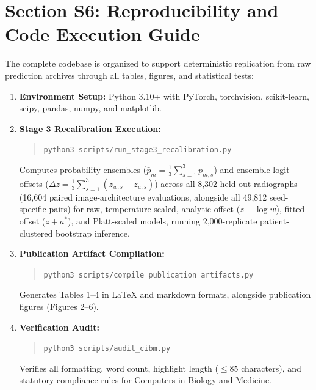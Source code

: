 \documentclass[preprint,12pt]{elsarticle}
\begin{document}
\section*{Section S6: Reproducibility and Code Execution Guide}
The complete codebase is organized to support deterministic replication from raw prediction archives through all tables, figures, and statistical tests:
\begin{enumerate}
    \item \textbf{Environment Setup:} Python 3.10+ with PyTorch, torchvision, scikit-learn, scipy, pandas, numpy, and matplotlib.
    \item \textbf{Stage 3 Recalibration Execution:}
    \begin{quote}
    \texttt{python3 scripts/run\_stage3\_recalibration.py}
    \end{quote}
    Computes probability ensembles ($\bar{p}_m = \frac{1}{3}\sum_{s=1}^3 p_{m,s}$) and ensemble logit offsets ($\Delta z = \frac{1}{3}\sum_{s=1}^3 (z_{w,s} - z_{u,s})$) across all 8,302 held-out radiographs (16,604 paired image-architecture evaluations, alongside all 49,812 seed-specific pairs) for raw, temperature-scaled, analytic offset ($z - \log w$), fitted offset ($z + a^*$), and Platt-scaled models, running 2,000-replicate patient-clustered bootstrap inference.
    \item \textbf{Publication Artifact Compilation:}
    \begin{quote}
    \texttt{python3 scripts/compile\_publication\_artifacts.py}
    \end{quote}
    Generates Tables 1--4 in LaTeX and markdown formats, alongside publication figures (Figures 2--6).
    \item \textbf{Verification Audit:}
    \begin{quote}
    \texttt{python3 scripts/audit\_cibm.py}
    \end{quote}
    Verifies all formatting, word count, highlight length ($\le 85$ characters), and statutory compliance rules for Computers in Biology and Medicine.
\end{enumerate}
\end{document}

